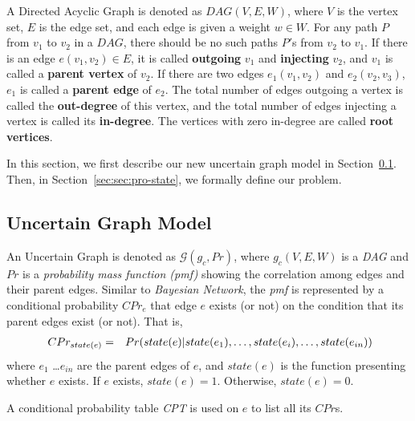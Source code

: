 \documentclass[runningheads,a4paper]{llncs}
\begin{document}
\vspace{-0.3cm}
\begin{definition}
\label{def:DAG}
A Directed Acyclic Graph is denoted as $DAG(V,E,W)$, where $V$ is the vertex set, $E$ is the edge set, and each edge is given a weight $w\in W$. For any path $P$ from $v_1$ to $v_2$ in a $DAG$, there should be no such paths $P'$s from $v_2$ to $v_1$. If there is an edge $e(v_1,v_2)\in E$, it is called \textbf{outgoing} $v_1$ and \textbf{injecting} $v_2$, and $v_1$ is called a \textbf{parent vertex} of $v_2$. If there are two edges $e_1(v_1,v_2)$ and $e_2(v_2,v_3)$, $e_1$ is called a \textbf{parent edge} of $e_2$. The total number of edges outgoing a vertex is called the \textbf{out-degree} of this vertex, and the total number of edges injecting a vertex is called its \textbf{in-degree}. The vertices with zero in-degree are called \textbf{root vertices}.
\end{definition}
\vspace{-0.3cm}

In this section, we first describe our new uncertain graph model in Section~\ref{sec:sec:model}. Then, in Section~\ref{sec:sec:pro-state}, we formally define our problem.

\vspace{-0.3cm}
\subsection{Uncertain Graph Model}
\label{sec:sec:model}

\vspace{-0.1cm}
\begin{definition}
  \label{def:ug}
  An Uncertain Graph is denoted as $\mathcal{G}(g_c,Pr)$, where $g_c(V,E,W)$ is a \emph{DAG} and $Pr$ is a \emph{probability mass function (pmf)} showing the correlation among edges and their parent edges. Similar to \emph{Bayesian Network}, the \emph{pmf} is represented by a conditional probability $CPr_{e}$ that edge $e$ exists (or not) on the condition that its parent edges exist (or not). That is,
\vspace{-0.3cm}
{\setlength\arraycolsep{2pt}
\begin{eqnarray}
\small
\label{eq:CPrmeaning}
\ CPr_{state(e)} & = & Pr(state(e) | state(e_1),\dots, state(e_i), \dots, state(e_{in}))
\vspace{-0.6cm}
\end{eqnarray}
}
where $e_1$ \dots $e_{in}$ are the parent edges of $e$, and $state(e)$ is the function presenting whether $e$ exists. If $e$ exists, $state(e)=1$. Otherwise, $state(e)=0$.

A conditional probability table \emph{CPT} is used on $e$ to list all its $CPr$s.
\vspace{-0.2cm}
\end{definition}
\end{document}

